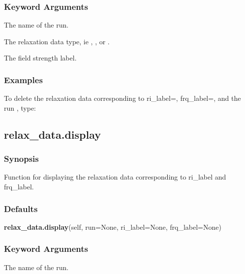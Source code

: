   
 \subsubsection{Keyword Arguments} 

   The name of the run.   

   The relaxation data type, ie , , or .   

   The field strength label.  

  

  
 \subsubsection{Examples} 

 To delete the relaxation data corresponding to ri\_label=, frq\_label=, and the run , type: 
  


  

 \newpage 

 \subsection{relax\_data.display} 

  
 \subsubsection{Synopsis} 

 Function for displaying the relaxation data corresponding to ri\_label and frq\_label. 
  

  
 \subsubsection{Defaults} 

 \textsf{\textbf{relax\_data.display}(self, run=None, ri\_label=None, frq\_label=None)} 

  
 \subsubsection{Keyword Arguments} 

   The name of the run.   


